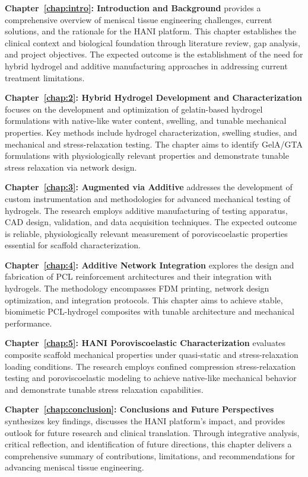 \textbf{Chapter~\ref{chap:intro}: Introduction and Background} provides a comprehensive overview of meniscal tissue engineering challenges, current solutions, and the rationale for the HANI platform. This chapter establishes the clinical context and biological foundation through literature review, gap analysis, and project objectives. The expected outcome is the establishment of the need for hybrid hydrogel and additive manufacturing approaches in addressing current treatment limitations.

\textbf{Chapter~\ref{chap:2}: Hybrid Hydrogel Development and Characterization} focuses on the development and optimization of gelatin-based hydrogel formulations with native-like water content, swelling, and tunable mechanical properties. Key methods include hydrogel characterization, swelling studies, and mechanical and stress-relaxation testing. The chapter aims to identify GelA/GTA formulations with physiologically relevant properties and demonstrate tunable stress relaxation via network design.

\textbf{Chapter~\ref{chap:3}: Augmented via Additive} addresses the development of custom instrumentation and methodologies for advanced mechanical testing of hydrogels. The research employs additive manufacturing of testing apparatus, CAD design, validation, and data acquisition techniques. The expected outcome is reliable, physiologically relevant measurement of poroviscoelastic properties essential for scaffold characterization.

\textbf{Chapter~\ref{chap:4}: Additive Network Integration} explores the design and fabrication of PCL reinforcement architectures and their integration with hydrogels. The methodology encompasses FDM printing, network design optimization, and integration protocols. This chapter aims to achieve stable, biomimetic PCL-hydrogel composites with tunable architecture and mechanical performance.

\textbf{Chapter~\ref{chap:5}: HANI Poroviscoelastic Characterization} evaluates composite scaffold mechanical properties under quasi-static and stress-relaxation loading conditions. The research employs confined compression stress-relaxation testing and poroviscoelastic modeling to achieve native-like mechanical behavior and demonstrate tunable stress relaxation capabilities.

\textbf{Chapter~\ref{chap:conclusion}: Conclusions and Future Perspectives} synthesizes key findings, discusses the HANI platform's impact, and provides outlook for future research and clinical translation. Through integrative analysis, critical reflection, and identification of future directions, this chapter delivers a comprehensive summary of contributions, limitations, and recommendations for advancing meniscal tissue engineering.

